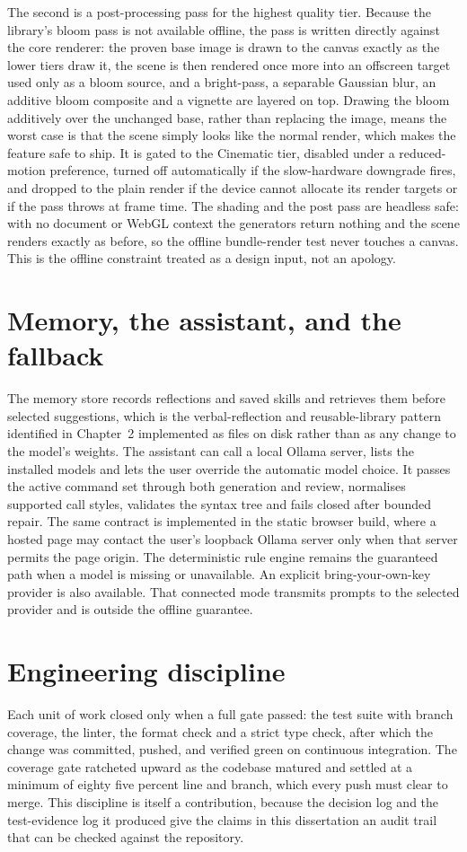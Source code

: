 \documentclass[11pt,a4paper]{report}
\begin{document}
The second is a post-processing pass for the highest quality tier. Because the library's bloom pass is not available offline, the pass is written directly against the core renderer: the proven base image is drawn to the canvas exactly as the lower tiers draw it, the scene is then rendered once more into an offscreen target used only as a bloom source, and a bright-pass, a separable Gaussian blur, an additive bloom composite and a vignette are layered on top. Drawing the bloom additively over the unchanged base, rather than replacing the image, means the worst case is that the scene simply looks like the normal render, which makes the feature safe to ship. It is gated to the Cinematic tier, disabled under a reduced-motion preference, turned off automatically if the slow-hardware downgrade fires, and dropped to the plain render if the device cannot allocate its render targets or if the pass throws at frame time. The shading and the post pass are headless safe: with no document or WebGL context the generators return nothing and the scene renders exactly as before, so the offline bundle-render test never touches a canvas. This is the offline constraint treated as a design input, not an apology.

\section{Memory, the assistant, and the fallback}
The memory store records reflections and saved skills and retrieves them before selected suggestions, which is the verbal-reflection and reusable-library pattern identified in Chapter~2 \citep{shinn2023,wang2023} implemented as files on disk rather than as any change to the model's weights. The assistant can call a local Ollama server, lists the installed models and lets the user override the automatic model choice. It passes the active command set through both generation and review, normalises supported call styles, validates the syntax tree and fails closed after bounded repair. The same contract is implemented in the static browser build, where a hosted page may contact the user's loopback Ollama server only when that server permits the page origin. The deterministic rule engine remains the guaranteed path when a model is missing or unavailable. An explicit bring-your-own-key provider is also available. That connected mode transmits prompts to the selected provider and is outside the offline guarantee.

\section{Engineering discipline}
\label{sec:engineering}
Each unit of work closed only when a full gate passed: the test suite with branch coverage, the linter, the format check and a strict type check, after which the change was committed, pushed, and verified green on continuous integration. The coverage gate ratcheted upward as the codebase matured and settled at a minimum of eighty five percent line and branch, which every push must clear to merge. This discipline is itself a contribution, because the decision log and the test-evidence log it produced give the claims in this dissertation an audit trail that can be checked against the repository.
\end{document}
